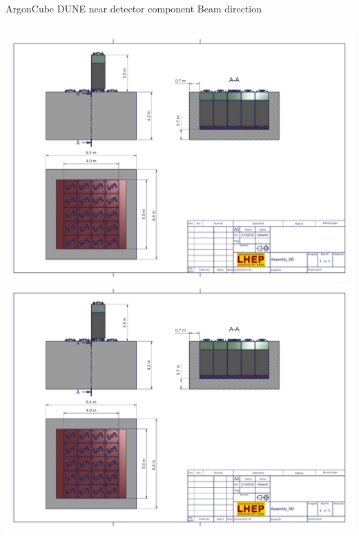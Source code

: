 \documentclass[]{beamer}
\newcommand*{\AC}{{ArgonCube}}
\newcommand*{\dune}{{DUNE}}
\begin{document}
\begin{frame}{\AC{} \dune{} near detector component}
	\centering
	\textbf{\textrightarrow{}\textrightarrow{}\textrightarrow{}} Beam direction \textbf{\textrightarrow{}\textrightarrow{}\textrightarrow{}}
	\begin{columns}[c]
		\centering
		\includegraphics[viewport=130 70 530 450, clip, height=\textwidth, angle=-90]{ac/dune_nd/Assembly_ND-1}
		\includegraphics[viewport=580 480 940 700, clip, width=\textwidth]{ac/dune_nd/Assembly_ND-1}
	\end{columns}
\end{frame}
\end{document}
